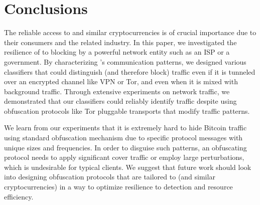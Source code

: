 \section{Conclusions}

The reliable access to \bc and similar cryptocurrencies is of crucial importance due to
their consumers and the related industry. 
In this paper, we investigated the resilience of \bc to blocking by a powerful network entity such as an ISP or a government.
By characterizing \bc's communication patterns, we designed 
various classifiers that could distinguish (and therefore block) \bc traffic 
even if it is tunneled over an encrypted channel like VPN or Tor, 
and even when it is mixed with background traffic. Through extensive experiments on network traffic, we demonstrated that our classifiers could reliably identify \bc traffic despite using obfuscation protocols like Tor pluggable transports that modify traffic patterns. 

We learn from our experiments that it is
extremely hard to hide Bitcoin traffic using standard obfuscation mechanism due to specific protocol messages with unique sizes and frequencies. In order to disguise such patterns, an obfuscating protocol needs to apply significant cover traffic or employ large perturbations, which is undesirable for typical clients. 
We suggest that future work should look into designing obfuscation protocols that are tailored to \bc (and similar cryptocurrencies) in a way to optimize resilience to detection and resource efficiency. 
 



